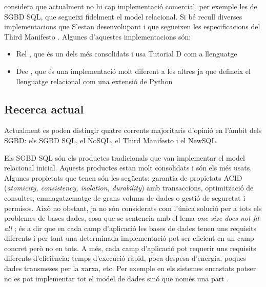 \textcite[cap.~2]{date06} %
considera que actualment no hi cap implementació comercial, per
exemple les de \gls{SGBD} \gls{SQL}, que segueixi fidelment el model relacional.
Si bé recull diverses implementacions que
S'estan desenvolupant i que segueixen les
especificacions del Third
Manifesto \parencite[Projects]{date:thethirdmanifesto.com}.  Algunes
d'aquestes implementacions són:
\begin{itemize}
\item Rel \parencite{rel}, que és un dels més consolidats i usa
  Tutorial D com a llenguatge
\item Dee \parencite{dee}, que és una implementació molt diferent a
  les altres ja que defineix el llenguatge relacional com una extensió
  de Python
\end{itemize}










\subsection{Recerca actual}

Actualment es poden distingir quatre corrents majoritaris d'opinió en
l'àmbit dels \gls{SGBD}: els \gls{SGBD} \gls{SQL}, el NoSQL, el Third Manifesto i el
NewSQL.

Els \gls{SGBD} \gls{SQL} són els productes tradicionals que van implementar el
model relacional inicial. Aquests productes estan molt consolidats i
són els més usats. Algunes propietats que tenen són les següents:
garantia de propietats ACID (\emph{atomicity, consistency, isolation,
  durability}) amb transaccions, optimització de consultes,
emmagatzematge de grans volums de dades o gestió de seguretat i
permisos.  Això no obstant, ja no són considerats com l'única solució
per a tots els problemes de bases dades, cosa que se sentencia amb el
lema \emph{one size does not fit
  all} \parencite{stonebraker07,stonebraker09}; és a dir que en cada
camp d'aplicació les bases de dades tenen uns requisits diferents i
per tant una determinada implementació pot ser eficient en un camp
concret però no en tots. A més, cada camp d'aplicació pot requerir uns
requisits diferents d'eficiència: temps d'execució ràpid, poca despesa
d'energia, poques dades transmeses per la xarxa, etc. Per exemple en
els sistemes encastats potser no es pot implementar tot el model de
dades sinó que només una
part \parencite{saake09:_downs_data_manag_embed_system}.



